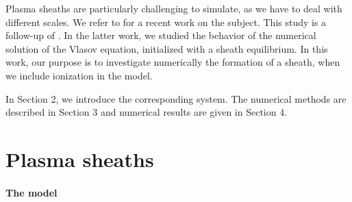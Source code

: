 \documentclass{article}
\numberwithin{equation}{section}
\newcommand{\todo}[1]{{\color{red}\textbf{#1}}}
\begin{document}
Plasma sheaths are particularly challenging to simulate, as we have to deal with different scales. We refer to  \cite{bourneNonUniformSplinesSemiLagrangian} for a recent work on the subject.
This study is a follow-up of \cite{badsiNumericalStabilityPlasma}. In the latter work, we studied the behavior of the numerical solution of the Vlasov equation, initialized with a sheath
equilibrium. In this work, our purpose is to investigate numerically the formation of a sheath, when we include ionization in the model. 

In Section 2, we introduce the corresponding system. The numerical methods are described in Section 3 and numerical results are given in Section 4. 

%

\section{Plasma sheaths}

\paragraph{The model}
\end{document}

